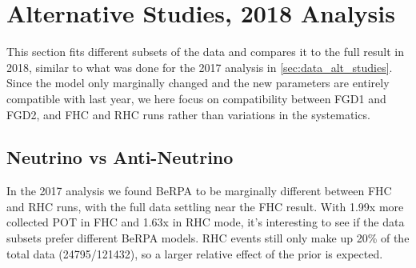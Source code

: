 \chapter{Alternative Studies, 2018 Analysis}
\label{chap:alt_studies_2018}
This section fits different subsets of the data and compares it to the full result in 2018, similar to what was done for the 2017 analysis in \autoref{sec:data_alt_studies}. Since the model only marginally changed and the new parameters are entirely compatible with last year, we here focus on compatibility between FGD1 and FGD2, and FHC and RHC runs rather than variations in the systematics.

\section{Neutrino vs Anti-Neutrino}
In the 2017 analysis we found BeRPA to be marginally different between FHC and RHC runs, with the full data settling near the FHC result. With 1.99x more collected POT in FHC and 1.63x in RHC mode, it's interesting to see if the data subsets prefer different BeRPA models. RHC events still only make up 20\% of the total data (24795/121432), so a larger relative effect of the prior is expected.

